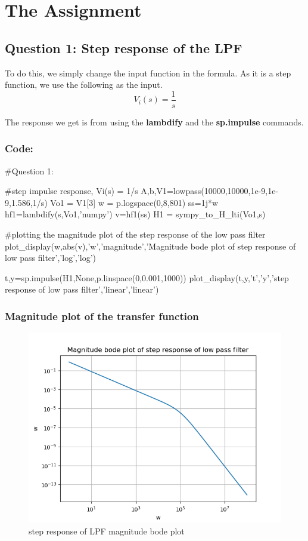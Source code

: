 \documentclass[11pt]{article}
\begin{document}
\section{The Assignment}

\subsection{Question 1: Step response of the LPF}
To do this, we simply change the input function in the formula. As it is a step function, we use the following as the input.
\begin{equation}
    V_i(s) = \frac{1}{s}
\end{equation}

The response we get is from using the \textbf{lambdify} and the \textbf{sp.impulse} commands.

\subsubsection{Code:}
\begin{python}
#Question 1:

#step impulse response, Vi(s) = 1/s
A,b,V1=lowpass(10000,10000,1e-9,1e-9,1.586,1/s)
Vo1 = V1[3]
w = p.logspace(0,8,801)
ss=1j*w
hf1=lambdify(s,Vo1,'numpy')
v=hf1(ss)
H1 = sympy_to_H_lti(Vo1,s)

#plotting the magnitude plot of the step response of the low pass filter
plot_display(w,abs(v),'w','magnitude','Magnitude bode plot of step response of low pass filter','log','log')

t,y=sp.impulse(H1,None,p.linspace(0,0.001,1000))
plot_display(t,y,'t','y','step response of low pass filter','linear','linear')
\end{python}

\subsubsection{Magnitude plot of the transfer function}
\begin{figure}[H]
    \centering
    \includegraphics[scale = 1]{Figure_2.png}
    \caption{step response of LPF magnitude bode plot}
\end{figure}
\end{document}
